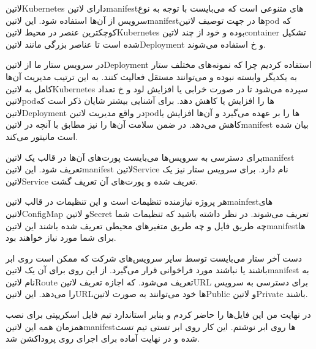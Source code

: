 \documentclass[a4]{report}
\begin{document}
‌لاتین{Kubernetes} دارای ‌لاتین{manifest}های متنوعی است که می‌بایست با توجه به نوع سرویس از آن‌ها استفاده شود.
این ‌لاتین{manifest}ها در جهت توصیف ‌لاتین{pod} که کوچکترین عنصر در محیط ‌لاتین{Kubernetes} بوده و خود از چند ‌لاتین{container}
تشکیل شده است تا عناصر بزرگی مانند ‌لاتین{Deployment} و ‌خ استفاده می‌شوند.

در سرویس ستار ما از ‌لاتین{Deployment} استفاده کردیم چرا که نمونه‌های مختلف ستار به یکدیگر وابسته نبوده و می‌توانند مستقل فعالیت کنند.
به این ترتیب مدیریت آن‌ها کامل به ‌لاتین{Kubernetes} سپرده می‌شود تا در صورت خرابی یا افزایش لود و ‌خ تعداد ‌لاتین{pod}ها را افزایش یا کاهش دهد.
برای آشنایی بیشتر شایان ذکر است که ‌لاتین{Deployment} در واقع مدیریت ‌لاتین{pod}ها را بر عهده می‌گیرد و آن‌ها افزایش یا کاهش می‌دهد.
در ضمن سلامت آن‌ها را نیز مطابق با آنچه در ‌لاتین{manifest} بیان شده است مانیتور می‌کند.

برای دسترسی به سرویس‌ها می‌بایست پورت‌های آن‌ها در قالب یک ‌لاتین{manifest} تعریف شود. این ‌لاتین{manifest} ‌لاتین{Service} نام دارد.
برای سرویس ستار نیز یک ‌لاتین{Service} تعریف شده و پورت‌های آن تعریف گشت.

هر پروژه نیازمنده تنظیمات است و این تنظیمات در قالب ‌لاتین{mainfest}های ‌لاتین{ConfigMap} و ‌لاتین{Secret} تعریف می‌شوند.
در نظر داشته باشید که تنظیمات شما چه طریق فایل و چه طریق متغیرهای محیطی تعریف شده باشند این ‌لاتین{manifest}ها برای شما مورد نیاز خواهند بود.

دست آخر ستار می‌بایست توسط سایر سرویس‌های شرکت که ممکن است روی ابر باشند یا نباشند مورد فراخوانی قرار می‌گیرد. از این روی برای آن یک ‌لاتین{manifest}
به نام ‌لاتین{Route} تعریف می‌شود. که اجازه تعریف ‌لاتین{URL} برای دسترسی به سرویس را می‌دهد.
این ‌لاتین{URL}ها خود می‌توانند به صورت ‌لاتین{Public} و ‌لاتین{Private} باشند.

در نهایت من این فایل‌ها را حاضر کردم و بنابر استاندارد تیم فایل اسکریپتی برای نصب همزمان همه این ‌لاتین{manifest}ها روی ابر نوشتم.
این کار روی ابر تستی تیم تست شده و در نهایت آماده برای اجرای روی پروداکشن شد.
\end{document}
